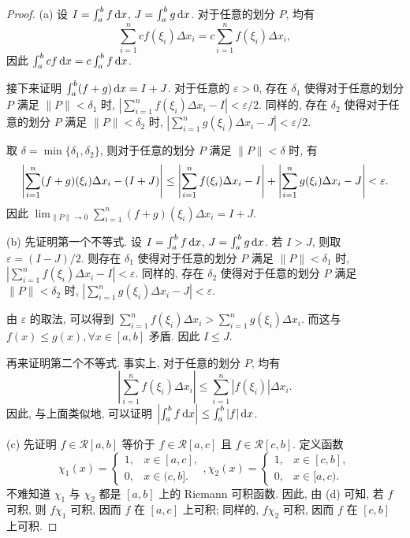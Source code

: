 ﻿\documentclass{article}
\begin{document}
\begin{proof}
  (a) 设 \( I= \int_a^b f \,\mathrm{d} x \), \( J= \int_a^b g \,\mathrm{d} x \). 对于任意的划分 \( P \), 均有
  \[ \sum_{i=1}^{n}cf(\xi_i)\Delta x_i=c \sum_{i=1}^{n}f(\xi_i)\Delta x_i, \]
  因此 \( \int_a^b cf \,\mathrm{d} x = c \int_a^b f \,\mathrm{d} x \).

  接下来证明 \( \int_a^b (f+g)\,\mathrm{d} x=I+J \). 对于任意的 \( \varepsilon>0 \), 存在 \( \delta_1 \) 使得对于任意的划分 \( P \) 满足 \( \|P\|<\delta_1 \) 时, \( \left|\sum_{i=1}^{n}f(\xi_i)\Delta x_i - I\right|<\varepsilon/2 \). 同样的, 存在 \( \delta_2 \) 使得对于任意的划分 \( P \) 满足 \( \|P\|<\delta_2 \) 时, \( \left|\sum_{i=1}^{n}g(\xi_i)\Delta x_i - J\right|<\varepsilon/2 \). 

  取 \( \delta=\min\{\delta_1,\delta_2\} \), 则对于任意的划分 \( P \) 满足 \( \|P\|<\delta \) 时, 有
  \[ \left|\sum_{i=1}^n(f+g)(\xi_i)\Delta x_i-(I+J)\right|
  \le \left|\sum_{i=1}^n f(\xi_i)\Delta x_i - I\right| + \left|\sum_{i=1}^n g(\xi_i)\Delta x_i - J\right| < \varepsilon. \]
  因此 \( \lim_{\|P\|\to 0}\sum_{i=1}^{n}(f+g)(\xi_i)\Delta x_i = I+J \).

  (b) 先证明第一个不等式. 设 \( I= \int_a^b f \,\mathrm{d} x \), \( J= \int_a^b g \,\mathrm{d} x \). 若 \( I>J \), 则取 \( \varepsilon=(I-J)/2 \). 则存在 \( \delta_1 \) 使得对于任意的划分 \( P \) 满足 \( \|P\|<\delta_1 \) 时, \( \left|\sum_{i=1}^{n}f(\xi_i)\Delta x_i - I\right|<\varepsilon \). 同样的, 存在 \( \delta_2 \) 使得对于任意的划分 \( P \) 满足 \( \|P\|<\delta_2 \) 时, \( \left|\sum_{i=1}^{n}g(\xi_i)\Delta x_i - J\right|<\varepsilon \).

  由 \( \varepsilon \) 的取法, 可以得到 \( \sum_{i=1}^{n}f(\xi_i)\Delta x_i>\sum_{i=1}^{n}g(\xi_i)\Delta x_i \). 而这与 \( f(x) \le g(x), \forall x \in [a, b] \) 矛盾. 因此 \( I \le J \).

  再来证明第二个不等式. 事实上, 对于任意的划分 \( P \), 均有
  \[ \left|\sum_{i=1}^{n}f(\xi_i)\Delta x_i\right| \le \sum_{i=1}^{n}|f(\xi_i)|\Delta x_i. \]
  因此, 与上面类似地, 可以证明 \( \left|\int_a^b f \,\mathrm{d} x\right| \le \int_a^b |f| \,\mathrm{d} x \).

  (c) 先证明 \( f\in \mathscr{R}[a,b] \) 等价于 \( f\in \mathscr{R}[a,c] \) 且 \( f\in \mathscr{R}[c,b] \). 定义函数
  \[ \chi_1(x)
  = \begin{cases} 1, & x \in [a, c], \\ 0, & x \in (c, b]. \end{cases}, 
  \chi_2(x)
  = \begin{cases} 1, & x \in [c, b], \\ 0, & x \in [a, c). \end{cases} \]
  不难知道 \( \chi_1 \) 与 \( \chi_2 \) 都是 \( [a, b] \) 上的 Riemann 可积函数. 因此, 由 (d) 可知, 若 \( f \) 可积, 则 \( f\chi_1 \) 可积, 因而 \( f \) 在 \( [a, c] \) 上可积; 同样的, \( f\chi_2 \) 可积, 因而 \( f \) 在 \( [c, b] \) 上可积.


\end{proof}
\end{document}
